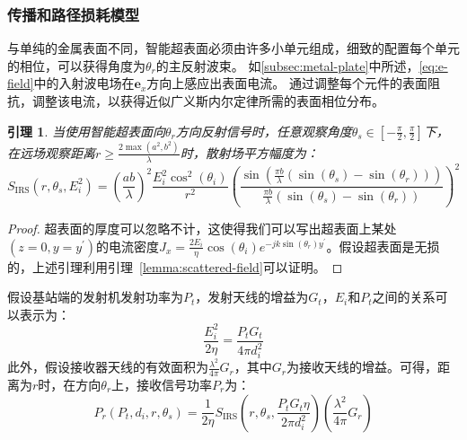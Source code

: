 \documentclass[supercite]{HustGraduPaper}
\newtheorem{lemma}{\indent 引理}[section]
\begin{document}
\subsubsection{传播和路径损耗模型}

与单纯的金属表面不同，智能超表面必须由许多小单元组成，细致的配置每个单元的相位，可以获得角度为$\theta_r$的主反射波束。
如\autoref{subsec:metal-plate}中所述，\autoref{eq:e-field}中的入射波电场在$\boldsymbol{e}_{x}$方向上感应出表面电流。
通过调整每个元件的表面阻抗，调整该电流，以获得近似广义斯内尔定律所需的表面相位分布。

\begin{lemma}
	当使用智能超表面向$\theta_r$方向反射信号时，任意观察角度$\theta_{s} \in\left[-\frac{\pi}{2}, \frac{\pi}{2}\right]$下，在远场观察距离$r \geq \frac{2 \max \left(a^{2}, b^{2}\right)}{\lambda}$时，散射场平方幅度为：
	\begin{equation}
		S_{\mathrm{IRS}}\left(r, \theta_{s}, E_{i}^{2}\right) =\left(\frac{a b}{\lambda}\right)^{2} \frac{E_{i}^{2} \cos ^{2}\left(\theta_{i}\right)}{r^{2}}\left(\frac{\sin \left(\frac{\pi b}{\lambda}\left(\sin \left(\theta_{s}\right)-\sin \left(\theta_{r}\right)\right)\right)}{\frac{\pi b}{\lambda}\left(\sin \left(\theta_{s}\right)-\sin \left(\theta_{r}\right)\right)}\right)^{2}
	\end{equation}
\end{lemma}

\begin{proof}
	超表面的厚度可以忽略不计，这使得我们可以写出超表面上某处$(z=0, y=y^\prime)$的电流密度$J_{x}=\frac{2 E_{i}}{\eta} \cos \left(\theta_{i}\right) e^{-j k \sin \left(\theta_{r}\right) y^{\prime}}$。假设超表面是无损的，上述引理利用引理~\ref{lemma:scattered-field}可以证明。
\end{proof}

假设基站端的发射机发射功率为$P_t$，发射天线的增益为$G_t$，$E_i$和$P_t$之间的关系可以表示为：
\begin{equation}
	\frac{E_{i}^{2}}{2 \eta}=\frac{P_{t} G_{t}}{4 \pi d_{i}^{2}}
\end{equation}
此外，假设接收器天线的有效面积为$\frac{\lambda^2}{4\pi} G_r$，其中$G_r$为接收天线的增益。可得，距离为$r$时，在方向$\theta_r$上，接收信号功率$P_r$为：
\begin{equation}
	P_{r}\left(P_{t}, d_{i}, r, \theta_{s}\right)=\frac{1}{2 \eta} S_{\mathrm{IRS}}\left(r, \theta_{s}, \frac{P_{t} G_{t} \eta}{2 \pi d_{i}^{2}}\right)\left(\frac{\lambda^{2}}{4 \pi} G_{r}\right)
\end{equation}
\end{document}
